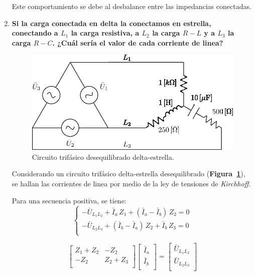 \documentclass[letter,11pt]{article}
\begin{document}
\begin{enumerate}
Este comportamiento se debe al desbalance entre las impedancias conectadas.

\item \textbf{Si la carga conectada en delta la conectamos en estrella,
conectando a $L_1$ la carga resistiva, a $L_2$ la carga $R-L$ y a $L_3$ la carga
$R-C$. ¿Cuál sería el valor de cada corriente de linea?}

\begin{figure}[!h]
\centering
\includegraphics[scale=1.00]{figura2.eps}
\caption{Circuito trifásico desequilibrado delta-estrella.}
\label{circuito2}
\end{figure}

Considerando un circuito trifásico delta-estrella desequilibrado
(\textbf{Figura~\ref{circuito2}}), se hallan las corrientes de linea por medio
de la ley de tensiones de \emph{Kirchhoff}.

Para una secuencia positiva, se tiene:
\begin{equation*}
    \begin{cases}
        -\bar{U}_{L_1L_2}+\bar{I}_a\,Z_1+(\bar{I}_a-\bar{I}_b)\,Z_2=0\\
        -\bar{U}_{L_2L_3}+(\bar{I}_b-\bar{I}_a)\,Z_2+\bar{I}_b\,Z_3=0\\
    \end{cases}
\end{equation*}

\begin{equation*}
    \begin{bmatrix}
        Z_1+Z_2 & -Z_2\\
        -Z_2    & Z_2+Z_3\\
    \end{bmatrix}
    \begin{bmatrix}
        \bar{I}_a \\
        \bar{I}_b \\
    \end{bmatrix}
    =
    \begin{bmatrix}
        \bar{U}_{L_1L_2}\\
        \bar{U}_{L_2L_3}\\
    \end{bmatrix}
\end{equation*}


\end{enumerate}
\end{document}
